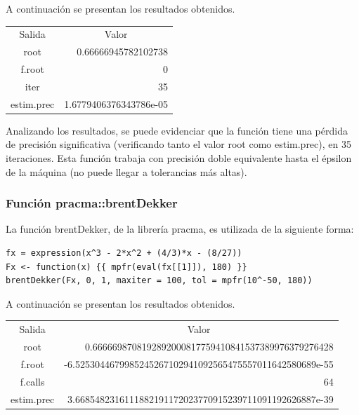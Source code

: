 \documentclass[a4paper,12pt]{article}
\begin{document}
A continuación se presentan los resultados obtenidos. \par

\begin{table}[ht!]
\begin{tabular}{cr}
Salida     & \multicolumn{1}{c}{Valor}                  \\
root       & 0.66666945782102738                        \\
f.root     & 0                                          \\
iter       & 35                                         \\
estim.prec & \multicolumn{1}{l}{1.6779406376343786e-05}
\end{tabular}
\end{table}

Analizando los resultados, se puede evidenciar que la función tiene una pérdida de precisión significativa (verificando tanto el valor root como estim.prec), en 35 iteraciones. Esta función trabaja con precisión doble equivalente hasta el épsilon de la máquina (no puede llegar a tolerancias más altas). \par

\newpage

\subsubsection{Función pracma::brentDekker}

La función brentDekker, de la librería pracma, es utilizada de la siguiente forma: \par

\begin{verbatim}
fx = expression(x^3 - 2*x^2 + (4/3)*x - (8/27))
Fx <- function(x) {{ mpfr(eval(fx[[1]]), 180) }}
brentDekker(Fx, 0, 1, maxiter = 100, tol = mpfr(10^-50, 180))
\end{verbatim}

A continuación se presentan los resultados obtenidos. \par

\begin{table}[ht!]
\begin{tabular}{cr}
Salida     & \multicolumn{1}{c}{Valor}                                \\
root       & 0.6666698708192892000817759410841537389976379276428      \\
f.root     & -6.5253044679985245267102941092565475557011642580689e-55 \\
f.calls    & 64                                                       \\
estim.prec & 3.6685482316111882191172023770915239711091192626887e-39 
\end{tabular}
\end{table}
\end{document}
